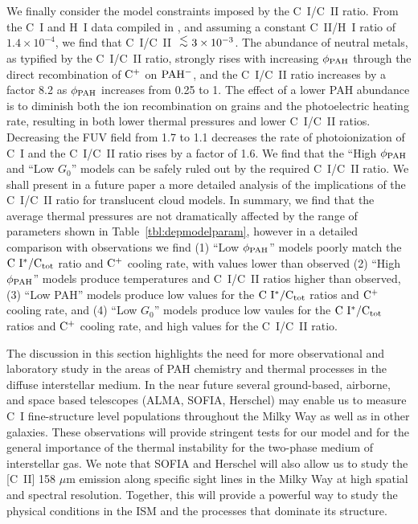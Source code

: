\documentclass[12pt,preprint,flushrt]{aastex}
\newcommand{\al}{\mbox{ \raisebox{-.4ex}{$\stackrel{\textstyle <}{\sim}$} }}
\begin{document}
We finally consider the model constraints imposed by 
the C~I/C~II ratio. From the C~I and H~I data compiled 
in \cite{wel01}, and assuming a constant C~II/H~I ratio of 
$1.4\times 10^{-4}$, we find that C~I/C~II $\al 3\times 10^{-3}$. 
The abundance of neutral metals, as typified by the C~I/C~II ratio, 
strongly rises with increasing  $\phi_{\rm PAH}$ through the 
direct recombination
of ${\rm C^+}$ on ${\rm PAH^-}$, and the C~I/C~II ratio increases by a factor
8.2 as $\phi_{\rm PAH}$ increases from 0.25 to 1. The effect of a 
lower PAH abundance is to diminish both the ion recombination on 
grains and the 
photoelectric heating rate, resulting in both lower thermal 
pressures and lower
C~I/C~II ratios. Decreasing the FUV field from 1.7 to 1.1 decreases the
rate of photoionization of C~I and the C~I/C~II ratio rises
by a factor of 1.6. We find that the ``High $\phi_{\rm PAH}$ and 
``Low $G_0$'' models can be safely ruled out by the required C~I/C~II
ratio. We shall present in a future paper a more detailed analysis
of the implications of the C~I/C~II ratio for translucent cloud models.
In summary, we find that the average thermal pressures are not dramatically
affected by the range of parameters shown in Table~\ref{tbl:depmodelparam},
however in a detailed comparison with observations we find 
(1) ``Low $\phi_{\rm PAH}$'' models poorly match the ${\rm C~I^*/C_{tot}}$
ratio and ${\rm C^+}$ cooling rate, with values lower than observed
(2) ``High $\phi_{\rm PAH}$''  models produce temperatures and 
C~I/C~II ratios higher than observed,
(3) ``Low PAH'' models produce low values for the ${\rm C~I^*/C_{tot}}$
ratios and ${\rm C^+}$ cooling rate,  and
(4) ``Low $G_0$'' models produce low vaules for the ${\rm C~I^*/C_{tot}}$
ratios and ${\rm C^+}$ cooling rate,  and high values for the 
C~I/C~II ratio. 

The discussion in this section highlights the need for more observational
and laboratory study in the areas of PAH chemistry and thermal processes
in the diffuse interstellar medium.
In the near future several ground-based,
airborne, and space based telescopes (ALMA, SOFIA, Herschel) may enable
us to measure C~I fine-structure level populations throughout the Milky Way
as well as in other galaxies.  These observations  will provide
stringent tests for our
model and for the general importance of the thermal instability for the
two-phase medium of interstellar gas.  We note that SOFIA and Herschel
will also allow us to study the [C~II] 158 $\mu$m emission along specific
sight lines in the Milky Way at high spatial and spectral resolution.
Together, this will provide a powerful way to study the physical
conditions in the ISM and the processes that dominate its structure.
\end{document}
